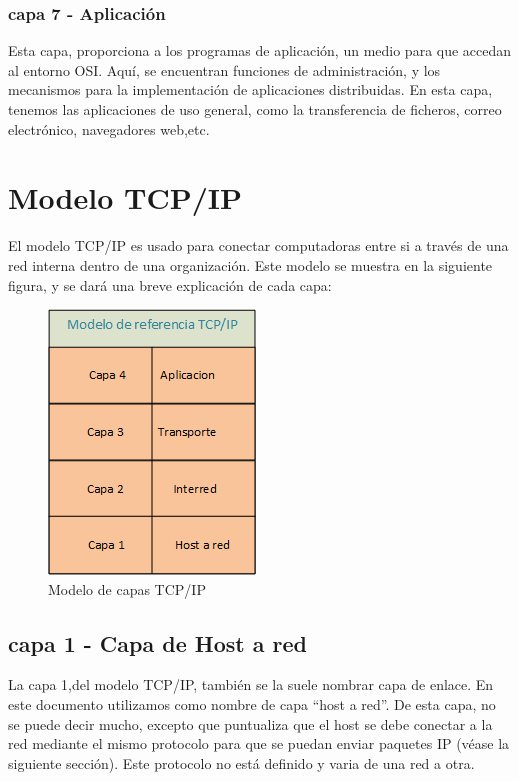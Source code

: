 \subsubsection{capa 7 - Aplicación} 
Esta capa, proporciona a los programas de aplicación, un medio para que accedan al entorno OSI. Aquí, se encuentran funciones de administración, y los mecanismos para la implementación de aplicaciones distribuidas. En esta capa, tenemos las aplicaciones de uso general, como la transferencia de ficheros, correo electrónico, navegadores web,etc. 


\section{Modelo TCP/IP} 
  El modelo TCP/IP es usado para conectar computadoras entre si a través de una red interna dentro de una organización. Este modelo se muestra en la siguiente figura, y se dará una breve explicación de cada capa: 
  \begin{figure}[ht]
  	\centering
  	\includegraphics{model_tcpip}
  	\caption{Modelo de capas TCP/IP}
  	\label{fig:model_tcpip}
  \end{figure} 

\subsection{capa 1 - Capa de Host a red}
La capa 1,del modelo TCP/IP, también se la suele nombrar capa de enlace. En este documento utilizamos como nombre de capa ``host a red''. De esta capa, no se puede decir mucho, excepto que puntualiza que el host se debe conectar a la red mediante el mismo protocolo para que se puedan enviar paquetes IP (véase la siguiente sección). Este protocolo no está definido y varia de una red a otra.
